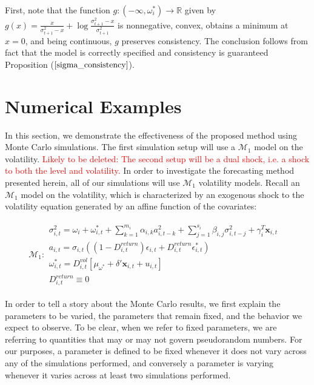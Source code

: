 \documentclass[11pt,3p,review,authoryear]{elsarticle}
\newcommand{\x}{\textbf{x}}
\def\mbf#1{\mathbf{#1}} %
\def\mc#1{\mathcal{#1}} %
\def\mc#1{\mathcal{#1}}
\theoremstyle{definition}
\newenvironment{proof-of-proposition}[1][{}]{\noindent{\bf
    Proof of Proposition {#1}}
  \hspace*{.5em}}{\qed\bigskip\\}
\begin{document}
\begin{proof-of-proposition}
  First, note that the function $g:(-\infty,\omega_{i}^{*})\rightarrow \mathbb{R}$ given by $g(x) = \frac{x}{\sigma^{2}_{t+1}-x} + \log{\frac{\sigma_{t+1}^{2}-x}{\sigma_{t+1}^{2}} }$ is nonnegative, convex, obtains a minimum at $x = 0$, and being continuous, $g$ preserves consistency. The conclusion follows from fact that the model is correctly specified and consistency is guaranteed Proposition ($\ref{sigma_consistency}$). 
  
\end{proof-of-proposition}

\section{Numerical Examples}

In this section, we demonstrate the effectiveness of the proposed method using Monte Carlo simulations.  The first simulation setup will use a $\mc{M}_{1}$ model on the volatility.  \textcolor{red}{Likely to be deleted: The second setup will be a dual shock, i.e. a shock to both the level and volatility.}  In order to investigate the forecasting method presented herein, all of our simulations will use $\mc{M}_1$ volatility models.  Recall an $\mc{M}_1$ model on the volatility, which is characterized by an exogenous shock to the volatility equation generated by an affine function of the covariates:

\begin{align*}
  \mc{M}_1 \colon \begin{array}{l}
     \sigma^{2}_{i,t} = \omega_{i} + \omega^{*}_{i,t} + \sum^{m_{i}}_{k=1}\alpha_{i,k}a^{2}_{i,t-k} + \sum_{j=1}^{s_{i}}\beta_{i,j}\sigma_{i,t-j}^{2} + \gamma_{i}^{T} \x_{i,t} \text{ }\\[.2cm]
     a_{i,t} = \sigma_{i,t}((1-D^{return}_{i,t})\epsilon_{i,t} + D^{return}_{i,t}\epsilon^{*}_{i,t})\\[.2cm]
    \omega_{i,t}^{*} = D^{vol}_{i,t}[\mu_{\omega^{*}}+\delta'\mbf{x}_{i, t}+ u_{i,t}]\\[.2cm]
    D^{return}_{i,t} \equiv 0
  \end{array}
  \end{align*}

  In order to tell a story about the Monte Carlo results, we first explain the parameters to be varied, the parameters that remain fixed, and the behavior we expect to observe.  To be clear, when we refer to fixed parameters, we are referring to quantities that may or may not govern pseudorandom numbers.  For our purposes, a parameter is defined to be fixed whenever it does not vary across any of the simulations performed, and conversely a parameter is varying whenever it varies across at least two simulations performed.
\end{document}
